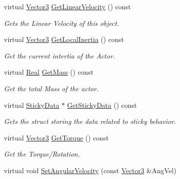 \begin{DoxyCompactItemize}
virtual \hyperlink{classMezzanine_1_1Vector3}{Vector3} \hyperlink{classMezzanine_1_1ActorRigidPhysicsSettings_ad238bf0f6d19a65a79a7b8bc0fb552bd}{GetLinearVelocity} () const 
\begin{DoxyCompactList}\small\item\em Gets the Linear Velocity of this object. \item\end{DoxyCompactList}\item 
virtual \hyperlink{classMezzanine_1_1Vector3}{Vector3} \hyperlink{classMezzanine_1_1ActorRigidPhysicsSettings_a71fae7a868e31ce14612336292bc0fca}{GetLocalInertia} () const 
\begin{DoxyCompactList}\small\item\em Get the current intertia of the Actor. \item\end{DoxyCompactList}\item 
virtual \hyperlink{namespaceMezzanine_a726731b1a7df72bf3583e4a97282c6f6}{Real} \hyperlink{classMezzanine_1_1ActorRigidPhysicsSettings_a6426940001f8d8e112763f6619278874}{GetMass} () const 
\begin{DoxyCompactList}\small\item\em Get the total Mass of the actor. \item\end{DoxyCompactList}\item 
virtual \hyperlink{structMezzanine_1_1StickyData}{StickyData} $\ast$ \hyperlink{classMezzanine_1_1ActorRigidPhysicsSettings_af3b11efb413c1e6a80e4fd5cd3f44715}{GetStickyData} () const 
\begin{DoxyCompactList}\small\item\em Gets the struct storing the data related to sticky behavior. \item\end{DoxyCompactList}\item 
virtual \hyperlink{classMezzanine_1_1Vector3}{Vector3} \hyperlink{classMezzanine_1_1ActorRigidPhysicsSettings_ae7406aca16a67e3ef959ff9cb76a0f44}{GetTorque} () const 
\begin{DoxyCompactList}\small\item\em Get the Torque/Rotation. \item\end{DoxyCompactList}\item 
virtual void \hyperlink{classMezzanine_1_1ActorRigidPhysicsSettings_a0e5b8a968b6f41dfeebd0fcfc01c6458}{SetAngularVelocity} (const \hyperlink{classMezzanine_1_1Vector3}{Vector3} \&AngVel)

\end{DoxyCompactItemize}
